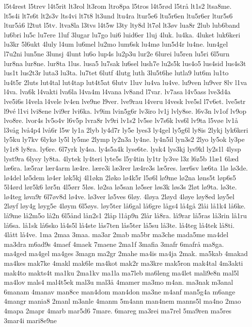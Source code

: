 {l5t4rest
l5trev
l4t5rit
lt3rol
lt3rom
ltro8pa
l5tros
l4t5rød
l5trå
lt1s2
ltsa8me.
lt5s4i
lt7s6t
lt2s3v
lts4vi
lt7t8
lt3und
ltu4ra
ltur5e6
ltu5r6en
ltu5r6er
ltur5s6
ltur5å6
l2tut
l5tv.
ltva8la
l3tvs
l4t5w
l3ty
lty8d
lt7øl
lt3øv
lua8r
2lub
lub6band
lu6bri
lu5c
lu7ere
1luf
3lugar
lu7go
lui6
luid6er
1luj
4luk.
lu4ka.
4luket
luk6keri
lu3kr
5l6ukt
4luly
l4um
lu6mel
lu2mo
lum6sk
lu4mø
lun5d4r
lu4ne.
lun4gel
l7u2ni
lun5ne
3lunsj
4lunt
lu6o
lup4s
lu2p3u
lur2e
6lurei
lu5ren
lu5ri
6l5urn
lur8na
lur8ne.
lur8ta
1lus.
lusa5
lu7sak
lu6sel
lush7e
lu2s5k
lus4o5
lus4sid
lus4s3t
lus1t
lus2t3r
luta3
lu3ta.
lu7tet
6lutf
4lutg
luth
3lu5t6he
lutla9
lut6m
lu1to
lu4t5r
2luts
lut4tal
lut4tap
lut4t5at
6lutv
1luv
lu4va
lu4ve.
lu9ven
lu9ver
8lv
l1va
l4va.
lva6k
l4vakti
lva6la
l4va4m
l4vana
lv8and
l7var.
lv7asa
l4v5ass
lve3d4a
lve5i6s
l4vela
l4vele
lv4en
lve9ne
l9ver.
lve9rau
l4veru
l4vesk
lve5sl
l7v6et.
lve5str
l9vé
l1vi
lvi8ene
lvi9er
lvi6ka.
lv9im
lvin5g6r
lv3iro
lv1j
lvly8se.
l6v3n
lv1of
lv9op
lvo8re.
lvor4s
lv5o4v
l6v5p
lvra8r
lv9ri
lv1s2
lv5se
lv7s6k
lvs6l
lv9ta
l5vøe
lv1å
l3våg
lvå4p4
lvå6r
l5w
ly1a
2lyb
ly4d7r
ly5e
lyes3
ly4gel
ly5g6l
ly8is
2lykj
lyk6keri
ly5ku
ly7kv
6lykø
ly5l
ly5me
2lymp
ly2n3a
ly4ne.
ly4n5il
lyn3s2
2lyo
ly5ok
ly3pe
ly1r8
ly8ra.
ly6re.
6l7yrk
ly4sa.
ly4s5a4k
lyse6te.
lysk4
lys3kj
lys9kl
ly2s1l
4lysp
lyst9ra
6lysy
ly8ta.
4lytek
ly4teri
lyte5s
l5y4tin
ly1tr
ly3ve
l3z
l6z5b
1læ1
6læd
læ6ra.
læ5rar
lær4arm
læ4re.
lære3i
læ3rer
læ4re3s
læ5res.
lær6sv
læ6ta
1lø
lø3de.
lø4del
lø5dem
lø4er
løk5kj
4l1økn
2løko
lø4k5r
l5ø6l
lø9me
lø2na
løns5t
løp6s5
5l4ørd
lør5k6
lør5n
4l5ørr
5løs.
lø2sa
lø5san
lø5ser
løs3k
løs3s
2løt
lø9ta.
lø3te.
lø4teg
løva9r
6l7øv8d
lø4ve.
lø3ver
lø5ves
6løy.
4løya
2løyd
4løye
løy8ed
løy5el
2løyf
løy4g
løyg5e
4løym
6l5øys.
løy5ter
lå6gal
lå6gre
lågs4
lå4gå
2låi
lå1k4
lå6ke.
lå9me
lå2m5o
lå2n
6l5ånd
lån2s1
2låp
l1åp9n
2lår
lå8ra.
lå9rar
lå5ras
lå3rin
lå1ru
lå6sa.
lå1sk
lå6sko
lå4s5l
lå4ste
lås7ten
lås5ter
lå5su
lå3te.
lå4teg
lå4tek
lå8ti.
4lått
lå4ve.
1ma
2maa
3maa.
ma3ar
2mab
ma5br
ma3che
mada5me
ma4del
ma3dra
m6ad9s
4maef
4maek
7maene
2ma1f
3mafia
3mafr
6mafrå
ma8ga.
ma4ged
ma4gel
ma4ges
3magn
ma2gr
2mahe
ma4is
ma4ja
2mak.
ma5kab
4makad
ma4kes
mak7ke
4makl
mak6le
ma4kot
mak2r
ma3kre
mak5ron
mak4tal
4m3akti
mak4to
makts4t
ma1ku
2ma1kv
ma1la
ma7leb
ma6leng
ma4let
mali9e8n
mal5l
ma4lov
mals4
mal4t5ek
mal3u
mal3å
4mamer
ma3mo
m4an.
ma3nak
m3anal
6manam
4manav
man8ce
man4dom
man4don
ma3ne
m4anf
man5g4a
m6ange
4mangr
mania8
2manl
m3anle
4manm
5m4ann
man4nem
manns5l
ma4no
2mao
4mapa
2mapr
4marb
mar5d6
7mare.
6mareg
ma3rei
ma7rel
5ma9ren
ma5res
3mar4i
mari8e9ne
}

